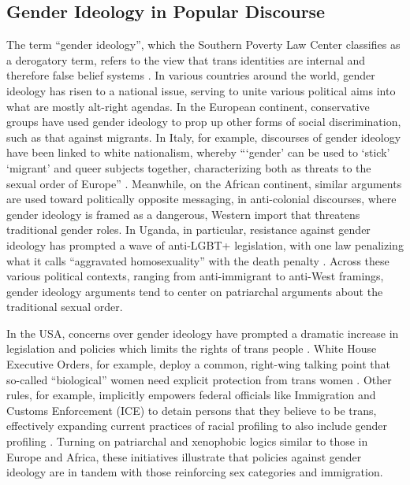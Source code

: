 \documentclass[anonymous,review]{acmart}
\begin{document}
\subsection{Gender Ideology in Popular Discourse}
The term “gender ideology”, which the Southern Poverty Law Center classifies as a derogatory term, refers to the view that trans identities are internal and therefore false belief systems \citep{splc:2023}. In various countries around the world, gender ideology has risen to a national issue, serving to unite various political aims into what are mostly alt-right agendas. In the European continent, conservative groups have used gender ideology to prop up other forms of social discrimination, such as that against migrants. In Italy, for example, discourses of gender ideology have been linked to white nationalism, whereby “‘gender’ can be used to ‘stick’ ‘migrant’ and queer subjects together, characterizing both as threats to the sexual order of Europe” \citep{indelicato:2024}. Meanwhile, on the African continent, similar arguments are used toward politically opposite messaging, in anti-colonial discourses, where gender ideology is framed as a dangerous, Western import that threatens traditional gender roles. In Uganda, in particular, resistance against gender ideology has prompted a wave of anti-LGBT+ legislation, with one law penalizing what it calls “aggravated homosexuality” with the death penalty \citep{bbc:2023}. Across these various political contexts, ranging from anti-immigrant to anti-West framings, gender ideology arguments tend to center on patriarchal arguments about the traditional sexual order.

In the USA, concerns over gender ideology have prompted a dramatic increase in legislation and policies which limits the rights of trans people \citep{ussd:2025,whitehousea:2025,whitehouseb:2025,translegislation:2025}. White House Executive Orders, for example, deploy a common, right-wing talking point that so-called “biological” women need explicit protection from trans women \citep{whitehousea:2025,whitehouseb:2025}. Other rules, for example, implicitly empowers federal officials like Immigration and Customs Enforcement (ICE) to detain persons that they believe to be trans, effectively expanding current practices of racial profiling to also include gender profiling \citep{vaca:206}. Turning on patriarchal and xenophobic logics similar to those in Europe and Africa, these initiatives illustrate that policies against gender ideology are in tandem with those reinforcing sex categories and immigration. 
\end{document}
